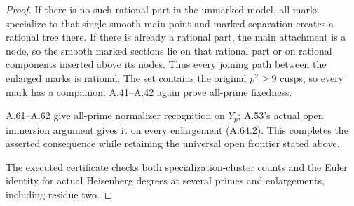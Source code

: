\begin{proof}
If there is no such rational part in the
unmarked model, all marks specialize to
that single smooth main point and marked
separation creates a rational tree there.
If there is already a rational part, the
main attachment is a node, so the smooth
marked sections lie on that rational part
or on rational components inserted above
its nodes. Thus every joining path between
the enlarged marks is rational. The set
contains the original \(p^2\ge9\) cusps,
so every mark has a companion. A.41--A.42
again prove all-prime fixedness.

A.61--A.62 give all-prime normalizer
recognition on \(Y_p\); A.53's actual open
immersion argument gives it on every
enlargement (A.64.2). This completes the
asserted consequence while retaining the
universal open frontier stated above.

The executed certificate
checks both specialization-cluster counts
and the Euler identity for actual
Heisenberg degrees at several primes and
enlargements, including residue two.
\end{proof}
